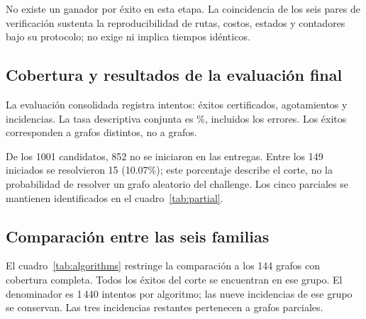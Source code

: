 No existe un ganador por éxito en esta etapa. La coincidencia de los seis pares de verificación sustenta la reproducibilidad de rutas, costos, estados y contadores bajo su protocolo; no exige ni implica tiempos idénticos.

\subsection{Cobertura y resultados de la evaluación final}
La evaluación consolidada registra \TotalAttempts{} intentos: \TotalSuccesses{} éxitos certificados, \TotalExhausted{} agotamientos y \TotalErrors{} incidencias. La tasa descriptiva conjunta es \SuccessRate\%, incluidos los errores. Los éxitos corresponden a \SolvedGraphs{} grafos distintos, no a \TotalSuccesses{} grafos.

\begin{table}[H]\centering\small
\caption{Entrega por integrante. ``Completos'' indica 60 combinaciones conciliadas, no grafos resueltos. HC indica grafos distintos certificados.}\label{tab:members}

\end{table}

De los 1001 candidatos, 852 no se iniciaron en las entregas. Entre los 149 iniciados se resolvieron 15 (10.07\%); este porcentaje describe el corte, no la probabilidad de resolver un grafo aleatorio del challenge. Los cinco parciales se mantienen identificados en el cuadro~\ref{tab:partial}.

\begin{table}[H]\centering\small
\caption{Grafos con cobertura parcial al cierre.}\label{tab:partial}

\end{table}

\subsection{Comparación entre las seis familias}
El cuadro~\ref{tab:algorithms} restringe la comparación a los 144 grafos con cobertura completa. Todos los éxitos del corte se encuentran en ese grupo. El denominador es 1\,440 intentos por algoritmo; las nueve incidencias de ese grupo se conservan. Las tres incidencias restantes pertenecen a grafos parciales.

\begin{table}[H]\centering\small
\caption{Resultados en 144 grafos completos. Media: tiempo de proceso disponible, incluidos agotamientos e incidencias; combina ejecución serial y paralela.}\label{tab:algorithms}

\end{table}

